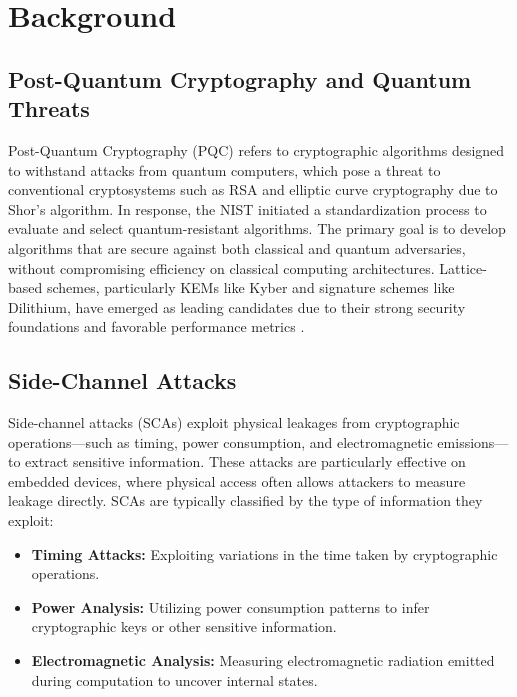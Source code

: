 \chapter{Background}
\thispagestyle{chapterstart}

\section{Post-Quantum Cryptography and Quantum Threats}

Post-Quantum Cryptography (\ac{PQC}) refers to cryptographic algorithms designed to withstand attacks from quantum computers, which pose a threat to conventional cryptosystems such as RSA and elliptic curve cryptography due to Shor’s algorithm. In response, the \ac{NIST} initiated a standardization process to evaluate and select quantum-resistant algorithms. The primary goal is to develop algorithms that are secure against both classical and quantum adversaries, without compromising efficiency on classical computing architectures. Lattice-based schemes, particularly \acp{KEM} like Kyber and signature schemes like Dilithium, have emerged as leading candidates due to their strong security foundations and favorable performance metrics \cite{Azouaoui22}.

\section{Side-Channel Attacks}

Side-channel attacks (\acp{SCA}) exploit physical leakages from cryptographic operations—such as timing, power consumption, and electromagnetic emissions—to extract sensitive information. These attacks are particularly effective on embedded devices, where physical access often allows attackers to measure leakage directly. \acp{SCA} are typically classified by the type of information they exploit:

\begin{itemize}
    \item \textbf{Timing Attacks:} Exploiting variations in the time taken by cryptographic operations.
    \item \textbf{Power Analysis:} Utilizing power consumption patterns to infer cryptographic keys or other sensitive information.
    \item \textbf{Electromagnetic Analysis:} Measuring electromagnetic radiation emitted during computation to uncover internal states.
\end{itemize}

